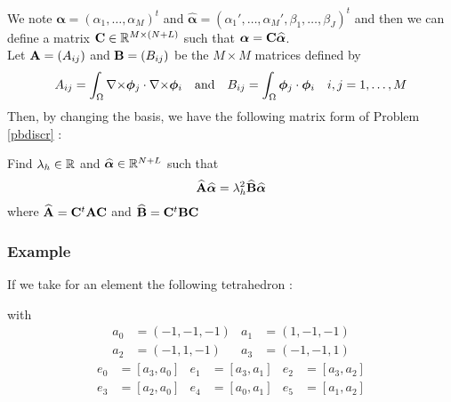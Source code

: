 We note $\bm{\alpha}=(\alpha_1,\dots,\alpha_M)^t$ and
$\widehat{\bm{\alpha}}=(\alpha_1',\dots,\alpha_M',\beta_1,\dots,\beta_J)^t$ and
then we can define a matrix ${\mathbf{C}}\in{\mathbb{R}}^{M\times(N+L)}$ such that $\bm{\alpha}={\mathbf{C}}\widehat{\bm{\alpha}}$.\\

Let ${\mathbf{A}}=(A_{ij})$ and ${\mathbf{B}}=(B_{ij})$ be the $M\times M$ matrices defined
by 
\[A_{ij}=\int_\Omega {\nabla\times}\bm{\phi}_j\cdot{\nabla\times}\bm{\phi}_i \quad\mbox{and}\quad
B_{ij}=\int_\Omega\bm{\phi}_j\cdot\bm{\phi}_i\quad i,j=1,\dots,M \]
Then, by changing the basis, we have the following matrix form of Problem
\ref{pbdiscr} :
\begin{pb}\label{pbmat}
Find $\lambda_h\in{\mathbb{R}}$ and $\widehat{\bm{\alpha}}\in{\mathbb{R}}^{N+L}$ such that
\[ \widehat{{\mathbf{A}}}\widehat{\bm{\alpha}} =
\lambda_h^2\widehat{{\mathbf{B}}}\widehat{\bm{\alpha}} \]
where $\widehat{{\mathbf{A}}}={\mathbf{C}}^t{\mathbf{A}}{\mathbf{C}}$ and $\widehat{{\mathbf{B}}}={\mathbf{C}}^t{\mathbf{B}}{\mathbf{C}}$
\end{pb}

\subsubsection{Example}
If we take for an element the following tetrahedron :
\begin{figure}[H]
\centering
{}
\end{figure}
with
\begin{align*}
a_0 &= (-1,-1,-1) & a_1 &= (1,-1,-1)\\
a_2 &= (-1,1,-1) & a_3 &= (-1,-1,1)
\end{align*}
\begin{align*}
e_0 &= [a_3,a_0] & e_1 &= [a_3,a_1] & e_2 &= [a_3,a_2]\\
e_3 &= [a_2,a_0] & e_4 &= [a_0,a_1] & e_5 &= [a_1,a_2]
\end{align*}


